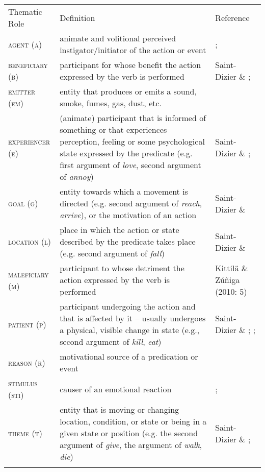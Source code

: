 \begin{tabularx}{\textwidth}{XXX}
\lsptoprule
{ Thematic Role} & { Definition} & { Reference}\\
{ \textsc{agent (a)}} & { animate and volitional perceived instigator/initiator of the action or event} & { \citet{Fillmore1968}; \citet[49]{Payne1997}}\\
{ \textsc{beneficiary (b)}} & { participant for whose benefit the action expressed by the verb is performed} & { Saint-Dizier \& \citet[11]{Viegas1995}; \citet[4]{PalmerEtAl2010}}\\
{ \textsc{emitter (em)}} & { entity that produces or emits a sound, smoke, fumes, gas, dust, etc.} & \\
{ \textsc{experiencer (e)}} & { (animate) participant that is informed of something or that experiences perception, feeling or some psychological state expressed by the predicate (e.g. first argument of \textit{love}, second argument of \textit{annoy})} & { Saint-Dizier \& \citet[11]{Viegas1995}; \citet[113]{Lobner2002}}\\
{ \textsc{goal (g)}} & { entity towards which a movement is directed (e.g. second argument of \textit{reach}, \textit{arrive}), or the motivation of an action} & { Saint-Dizier \& \citet[11]{Viegas1995}}\\
{ \textsc{location (l)}} & { place in which the action or state described by the predicate takes place (e.g. second argument of \textit{fall})} & { Saint-Dizier \& \citet[11]{Viegas1995}}\\
{ \textsc{maleficiary (m)}} & { participant to whose detriment the action expressed by the verb is performed } & { Kittilä \& Zúñiga (2010: 5)}\\
{ \textsc{patient (p)}} & { participant undergoing the action and that is affected by it – usually undergoes a physical, visible change in state (e.g., second argument of \textit{kill}, \textit{eat}) } & { Saint-Dizier \& \citet[11]{Viegas1995}; \citet[4]{PalmerEtAl2010}; \citet[51]{Payne1997}}\\
{ \textsc{reason (r)}} & { motivational source of a predication or event} & { \citet[225]{Frawley1992}}\\
{ \textsc{stimulus (sti)}} & { causer of an emotional reaction} & { \citet[13]{PalmerEtAl2010}; \citet{Dowty1991}}\\
{ \textsc{theme (t)}} & { entity that is moving or changing location, condition, or state or being in a given state or position (e.g. the second argument of \textit{give}, the argument of \textit{walk}, \textit{die})} & { Saint-Dizier \& \citet[11]{Viegas1995}; \citet[4]{PalmerEtAl2010}}\\
\lspbottomrule
\end{tabularx}

